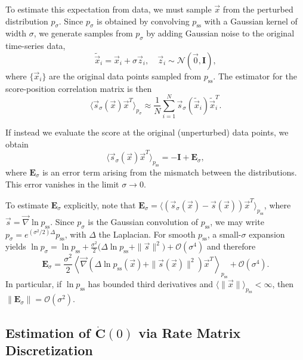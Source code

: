 \documentclass[%
  prl,
  reprint,
  amsmath,
  amssymb,
  aps
]{revtex4-2}
\newcommand{\vvec}[1]{\vec{#1}}
\begin{document}
To estimate this expectation from data, we must sample $\vvec{x}$ from the perturbed distribution $p_\sigma$. Since $p_\sigma$ is obtained by convolving $p_{\mathrm{ss}}$ with a Gaussian kernel of width $\sigma$, we generate samples from $p_\sigma$ by adding Gaussian noise to the original time-series data,
\begin{equation}
\tilde{\vvec{x}}_i = \vvec{x}_i + \sigma \vvec{z}_i, \quad \vvec{z}_i \sim \mathcal{N}(\vvec{0}, \bm{I}),
\end{equation}
where $\{\vvec{x}_i\}$ are the original data points sampled from $p_{\mathrm{ss}}$. The estimator for the score-position correlation matrix is then
\begin{equation}
\langle \vvec{s}_\sigma(\vvec{x}) \vvec{x}^T \rangle_{p_\sigma} \approx \frac{1}{N} \sum_{i=1}^{N} \vvec{s}_\sigma(\tilde{\vvec{x}}_i) \tilde{\vvec{x}}_i^T.
\end{equation}

If instead we evaluate the score at the original (unperturbed) data points, we obtain
\begin{equation}
\langle \vvec{s}_\sigma(\vvec{x}) \vvec{x}^T \rangle_{p_{\mathrm{ss}}} = -\bm{I} + \bm{E}_\sigma,
\end{equation}
where $\bm{E}_\sigma$ is an error term arising from the mismatch between the distributions. This error vanishes in the limit $\sigma \to 0$.

To estimate $\bm{E}_\sigma$ explicitly, note that $\bm{E}_\sigma = \langle (\vvec{s}_\sigma(\vvec{x})-\vvec{s}(\vvec{x}))\vvec{x}^T \rangle_{p_{\mathrm{ss}}}$, where $\vvec{s}=\vvec{\nabla}\ln p_{\mathrm{ss}}$. Since $p_\sigma$ is the Gaussian convolution of $p_{\mathrm{ss}}$, we may write $p_\sigma = e^{(\sigma^2/2)\Delta}p_{\mathrm{ss}}$, with $\Delta$ the Laplacian. For smooth $p_{\mathrm{ss}}$, a small-$\sigma$ expansion yields $\ln p_\sigma = \ln p_{\mathrm{ss}} + \frac{\sigma^2}{2}\bigl(\Delta \ln p_{\mathrm{ss}} + \|\vvec{s}\|^2\bigr) + \mathcal{O}(\sigma^4)$ and therefore
\begin{equation}
\bm{E}_\sigma
=
\frac{\sigma^2}{2}\left\langle \vvec{\nabla}\!\left(\Delta \ln p_{\mathrm{ss}}(\vvec{x}) + \|\vvec{s}(\vvec{x})\|^2\right)\vvec{x}^T \right\rangle_{p_{\mathrm{ss}}}
+ \mathcal{O}(\sigma^4).
\end{equation}
In particular, if $\ln p_{\mathrm{ss}}$ has bounded third derivatives and $\langle \|\vvec{x}\|\rangle_{p_{\mathrm{ss}}}<\infty$, then $\|\bm{E}_\sigma\|=\mathcal{O}(\sigma^2)$.

\subsection{Estimation of \texorpdfstring{$\dot{\bm{C}}(0)$}{Cdot(0)} via Rate Matrix Discretization}
\end{document}
